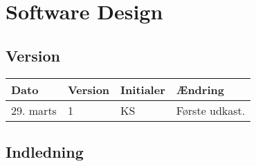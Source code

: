 \chapter{Software Design} \label{ch:SwDesign}

\section{Version}
\begin{table}[h]
	\centering
	\begin{tabularx}{\textwidth - 2cm}{|l|l|l|X|}
	\hline
	Dato	& Version	& Initialer & Ændring	\\ \hline
	29. marts & 1 & KS & Første udkast. \\ \hline 
	\end{tabularx}
\end{table}

\section{Indledning}




